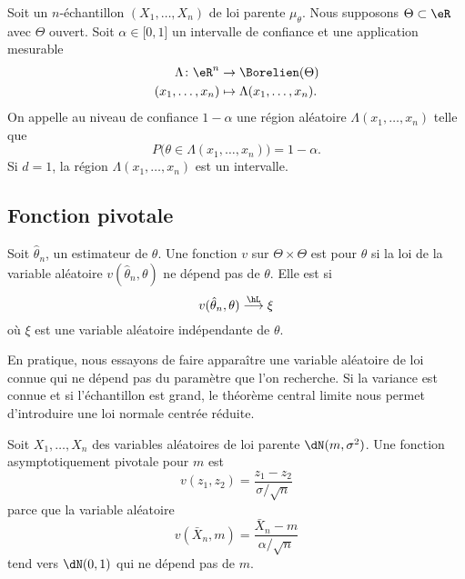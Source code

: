 Soit un \( n\)-échantillon \( (X_1,\ldots,X_n)\) de loi parente \( \mu_{\theta}\). Nous supposons \( \Theta\subset\eR\) avec \( \Theta\) ouvert. Soit \( \alpha\in\mathopen[ 0 , 1 \mathclose]\) un intervalle de confiance et une application mesurable
\begin{equation}
    \begin{aligned}
        \Lambda\colon \eR^n&\to \Borelien(\Theta) \\
        (x_1,\ldots,x_n)&\mapsto \Lambda(x_1,\ldots,x_n).
    \end{aligned}
\end{equation}
On appelle  au niveau de confiance \( 1-\alpha\) une région aléatoire \( \Lambda(x_1,\ldots,x_n)\) telle que
\begin{equation}
    P\big( \theta\in\Lambda(x_1,\ldots,x_n) \big)=1-\alpha.
\end{equation}
Si \( d=1\), la région \( \Lambda(x_1,\ldots,x_n)\) est un intervalle.

\subsection{Fonction pivotale}

Soit \( \hat\theta_n\), un estimateur de \( \theta\). Une fonction \( v\) sur \( \Theta\times\Theta\) est  pour \( \theta\) si la loi de la variable aléatoire \( v(\hat\theta_n,\theta)\) ne dépend pas de \( \theta\). Elle est  si
\begin{equation}
    v(\hat\theta_n,\theta)\stackrel{\hL}{\longrightarrow}\xi
\end{equation}
où \( \xi\) est une variable aléatoire indépendante de \( \theta\).

En pratique, nous essayons de faire apparaître une variable aléatoire de loi connue qui ne dépend pas du paramètre que l'on recherche. Si la variance est connue et si l'échantillon est grand, le théorème central limite nous permet d'introduire une loi normale centrée réduite.

\begin{example}
    Soit \( X_1,\ldots,X_n\) des variables aléatoires de loi parente \( \dN(m,\sigma^2)\). Une fonction asymptotiquement pivotale pour \( m\) est
    \begin{equation}
        v(z_1,z_2)=\frac{ z_1-z_2 }{ \sigma/\sqrt{n} }
    \end{equation}
    parce que la variable aléatoire
    \begin{equation}
        v(\bar X_n,m)=\frac{ \bar X_n-m }{ \alpha/\sqrt{n} }
    \end{equation}
    tend vers \( \dN(0,1)\) qui ne dépend pas de \( m\).
\end{example}

